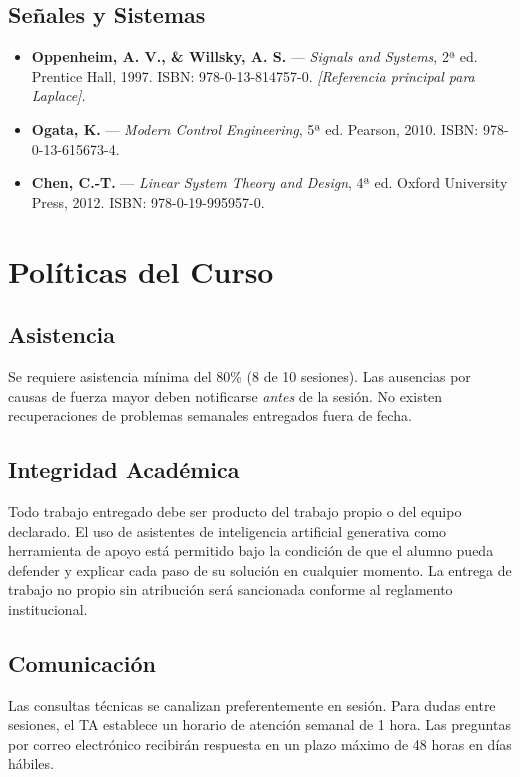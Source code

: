 \documentclass[11pt, letterpaper]{article}
\begin{document}
\subsection*{Señales y Sistemas}
\begin{itemize}
  \item \textbf{Oppenheim, A. V., \& Willsky, A. S.} — \emph{Signals and Systems}, 2ª ed. Prentice Hall, 1997. ISBN: 978-0-13-814757-0. \textit{[Referencia principal para Laplace].}
  \item \textbf{Ogata, K.} — \emph{Modern Control Engineering}, 5ª ed. Pearson, 2010. ISBN: 978-0-13-615673-4.
  \item \textbf{Chen, C.-T.} — \emph{Linear System Theory and Design}, 4ª ed. Oxford University Press, 2012. ISBN: 978-0-19-995957-0.
\end{itemize}

\newpage

\section{Políticas del Curso}

\subsection{Asistencia}
Se requiere asistencia mínima del 80\% (8 de 10 sesiones). Las ausencias por causas de fuerza mayor deben notificarse \emph{antes} de la sesión. No existen recuperaciones de problemas semanales entregados fuera de fecha.

\subsection{Integridad Académica}
Todo trabajo entregado debe ser producto del trabajo propio o del equipo declarado. El uso de asistentes de inteligencia artificial generativa como herramienta de apoyo está permitido bajo la condición de que el alumno pueda defender y explicar cada paso de su solución en cualquier momento. La entrega de trabajo no propio sin atribución será sancionada conforme al reglamento institucional.

\subsection{Comunicación}
Las consultas técnicas se canalizan preferentemente en sesión. Para dudas entre sesiones, el TA establece un horario de atención semanal de 1 hora. Las preguntas por correo electrónico recibirán respuesta en un plazo máximo de 48 horas en días hábiles.
\end{document}

